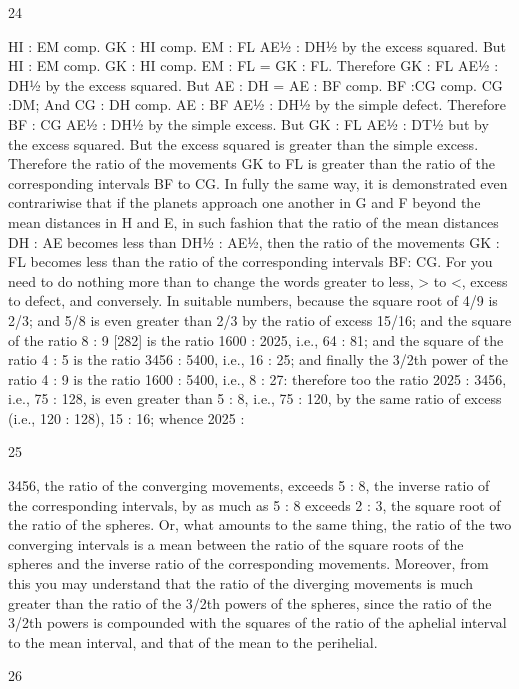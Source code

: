 \documentclass{article}
\begin{document}
24

HI : EM comp. GK : HI comp. EM : FL AE½ : DH½
by the excess squared. But
HI : EM comp. GK : HI comp. EM : FL = GK : FL.
Therefore
GK : FL AE½ : DH½
by the excess squared. But
AE : DH = AE : BF comp. BF :CG comp. CG :DM;
And
CG : DH comp. AE : BF AE½ : DH½
by the simple defect. Therefore
BF : CG AE½ : DH½
by the simple excess. But
GK : FL AE½ : DT½
but by the excess squared. But the excess squared is greater than the
simple excess. Therefore the ratio of the movements GK to FL is greater
than the ratio of the corresponding intervals BF to CG.
In fully the same way, it is demonstrated even contrariwise that if the
planets approach one another in G and F beyond the mean distances
in H and E, in such fashion that the ratio of the mean
distances DH : AE becomes less than DH½ : AE½, then the ratio of the
movements GK : FL becomes less than the ratio of the corresponding
intervals BF: CG. For you need to do nothing more than to change the
words greater to less, > to <, excess to defect, and conversely.
In suitable numbers, because the square root of 4/9 is 2/3; and 5/8 is
even greater than 2/3 by the ratio of excess 15/16; and the square of the
ratio 8 : 9 [282] is the ratio 1600 : 2025, i.e., 64 : 81; and the square of
the ratio 4 : 5 is the ratio 3456 : 5400, i.e., 16 : 25; and finally the 3/2th
power of the ratio 4 : 9 is the ratio 1600 : 5400, i.e., 8 : 27: therefore too
the ratio 2025 : 3456, i.e., 75 : 128, is even greater than 5 : 8, i.e., 75 :
120, by the same ratio of excess (i.e., 120 : 128), 15 : 16; whence 2025 :


25

3456, the ratio of the converging movements, exceeds 5 : 8, the inverse
ratio of the corresponding intervals, by as much as 5 : 8 exceeds 2 : 3, the
square root of the ratio of the spheres. Or, what amounts to the same
thing, the ratio of the two converging intervals is a mean between the
ratio of the square roots of the spheres and the inverse ratio of the
corresponding movements.
Moreover, from this you may understand that the ratio of the diverging
movements is much greater than the ratio of the 3/2th powers of the
spheres, since the ratio of the 3/2th powers is compounded with the
squares of the ratio of the aphelial interval to the mean interval, and that
of the mean to the perihelial.


26
\end{document}

